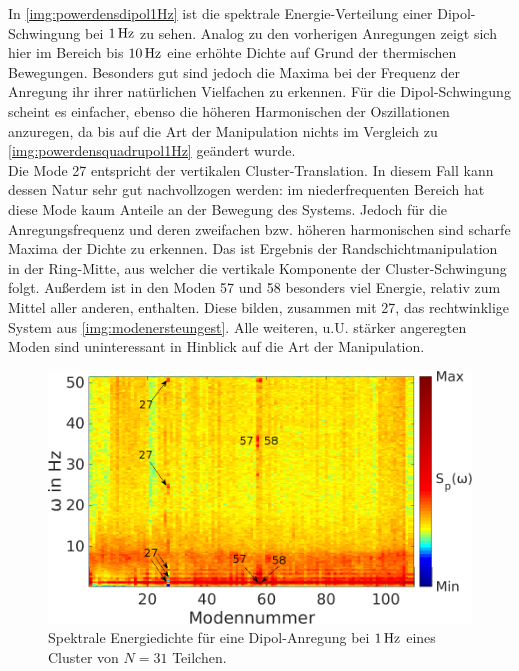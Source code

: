             In \autoref{img:powerdensdipol1Hz} ist die spektrale Energie-Verteilung einer Dipol-Schwingung bei $\unit[1]{Hz}$ zu sehen. Analog zu den vorherigen Anregungen zeigt sich hier im Bereich bis $\unit[10]{Hz}$ eine erhöhte Dichte auf Grund der thermischen Bewegungen. Besonders gut sind jedoch die Maxima bei der Frequenz der Anregung ihr ihrer natürlichen Vielfachen zu erkennen. Für die Dipol-Schwingung scheint es einfacher, ebenso die höheren Harmonischen der Oszillationen anzuregen, da bis auf die Art der Manipulation nichts im Vergleich zu \autoref{img:powerdensquadrupol1Hz} geändert wurde.\\
            Die Mode 27 entspricht der vertikalen Cluster-Translation. In diesem Fall kann dessen Natur sehr gut nachvollzogen werden: im niederfrequenten Bereich hat diese Mode kaum Anteile an der Bewegung des Systems. Jedoch für die Anregungsfrequenz und deren zweifachen bzw. höheren harmonischen sind scharfe Maxima der Dichte zu erkennen. Das ist Ergebnis der Randschichtmanipulation in der Ring-Mitte, aus welcher die vertikale Komponente der Cluster-Schwingung folgt. Außerdem ist in den Moden 57 und 58 besonders viel Energie, relativ zum Mittel aller anderen, enthalten. Diese bilden, zusammen mit 27, das rechtwinklige System aus \autoref{img:modenersteungest}. Alle weiteren, u.U. stärker angeregten Moden sind uninteressant in Hinblick auf die Art der Manipulation.

              \begin{figure}[!t]
                \centering
                \includegraphics[width=\textwidth,height=0.5\textwidth]{figs/auswertung/manipulation/dipol1Hzpowerdens.png}
                \caption{Spektrale Energiedichte für eine Dipol-Anregung  bei $\unit[1]{Hz}$ eines Cluster von $N=31$ Teilchen.}\label{img:powerdensdipol1Hz}
                \vspace{-0.5cm}
              \end{figure}

